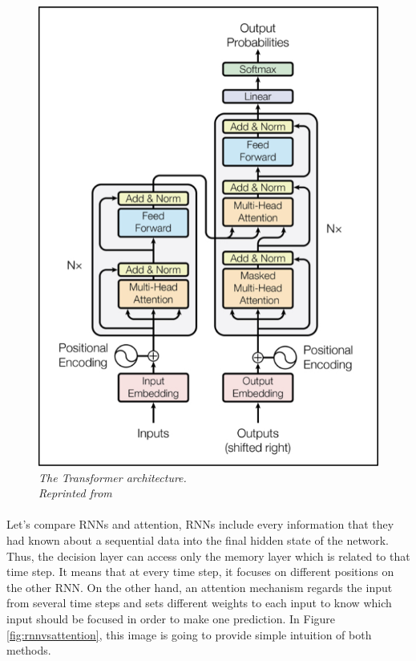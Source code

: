 \begin{figure}[H]
  \centering
  \caption[The Transformer architecture.]{\emph{The Transformer architecture. \\Reprinted from \citeauthor{vaswani_shazeer_parmar_uszkoreit_jones_n_gomez_kaiser_polosukhin_2017} \citeyear{vaswani_shazeer_parmar_uszkoreit_jones_n_gomez_kaiser_polosukhin_2017}}}\label{fig:attention}
  \includegraphics[scale = 0.4
  ]{figures/attention.jpg}  
\end{figure}

\paragraph{}
Let’s compare RNNs and attention, RNNs include every information that they had known about a sequential data into the final hidden state of the network. Thus, the decision layer can access only the memory layer which is related to that time step. It means that at every time step, it focuses on different positions on the other RNN. On the other hand, an attention mechanism regards the input from several time steps and sets different weights to each input to know which input should be focused in order to make one prediction. In Figure \ref{fig:rnnvsattention}, this image is going to provide simple intuition of both methods.

